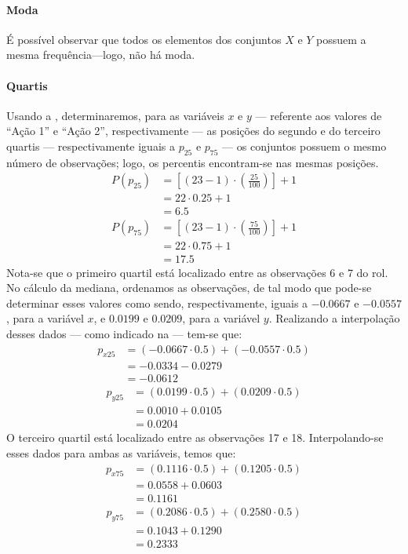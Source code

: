 \begin{resolucao}
\paragraph{Moda} É possível observar que todos os elementos dos conjuntos
$X$ e $Y$ possuem a mesma frequência---logo, não há moda.

\paragraph{Quartis} Usando a , determinaremos, para
as variáveis $x$ e $y$ --- referente aos valores de ``Ação 1'' e
``Ação 2'', respectivamente --- as posições do segundo e do terceiro
quartis --- respectivamente iguais a $p_{25}$ e $p_{75}$ --- os conjuntos
possuem o mesmo número de observações; logo, os percentis encontram-se nas
mesmas posições.
\begin{align*}
    P(p_{25}) &= \left[(23-1) \cdot \left(\frac{25}{100}\right)\right] + 1 \\
    &= 22 \cdot 0.25 + 1 \\
    &= 6.5
\end{align*}
\begin{align*}
    P(p_{75}) &= \left[(23-1) \cdot \left(\frac{75}{100}\right)\right] + 1 \\
    &= 22 \cdot 0.75 + 1 \\
    &= 17.5
\end{align*}
Nota-se que o primeiro quartil está localizado entre as observações 6 e 7
do rol. No cálculo da mediana, ordenamos as observações, de tal modo que
pode-se determinar esses valores como sendo, respectivamente, iguais a
$-0.0667$ e $-0.0557$, para a variável $x$, e $0.0199$ e $0.0209$, para a
variável $y$.
Realizando a interpolação desses dados --- como indicado na
 --- tem-se que:
\begin{align*}
    p_{x25} &=  (-0.0667 \cdot 0.5) + (-0.0557 \cdot 0.5) \\
            &= -0.0334 - 0.0279 \\
            &= -0.0612
\end{align*}
\begin{align*}
    p_{y25} &=  (0.0199 \cdot 0.5) + (0.0209 \cdot 0.5) \\
            &= 0.0010 + 0.0105 \\
            &= 0.0204
\end{align*}
O terceiro quartil está localizado entre as observações 17 e 18.
Interpolando-se esses dados para ambas as variáveis, temos que:
\begin{align*}
    p_{x75} &=  (0.1116 \cdot 0.5) + (0.1205 \cdot 0.5) \\
            &= 0.0558 + 0.0603 \\
            &= 0.1161
\end{align*}
\begin{align*}
    p_{y75} &=  (0.2086 \cdot 0.5) + (0.2580 \cdot 0.5) \\
            &= 0.1043 + 0.1290 \\
            &= 0.2333
\end{align*}


\end{resolucao}
